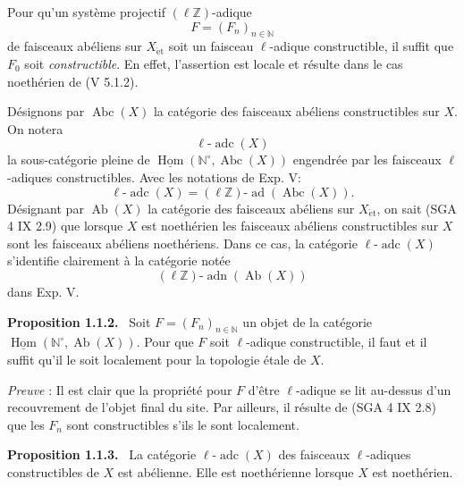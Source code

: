 \documentclass[11pt]{article}
\newenvironment{statement}[1]{\par\medskip\noindent\textbf{#1.}\ }{\par\medskip}
\DeclareMathOperator{\Hom}{Hom}
\providecommand{\uHom}{\underline{\Hom}}
\providecommand{\Hom}{\operatorname{Hom}}
\providecommand{\adn}{\operatorname{adn}}
\providecommand{\Ab}{\operatorname{Ab}}
\providecommand{\Abc}{\operatorname{Abc}}
\providecommand{\adc}{\operatorname{adc}}
\providecommand{\ad}{\operatorname{ad}}
\providecommand{\adn}{\operatorname{adn}}
\providecommand{\Ab}{\operatorname{Ab}}
\providecommand{\Hom}{\operatorname{Hom}}
\begin{document}
Pour qu'un système projectif \((\ell\mathbb Z)\)-adique
\[
F=(F_n)_{n\in\mathbb N}
\]
de faisceaux abéliens sur \(X_{\mathrm{\acute et}}\) soit un faisceau \(\ell\)-adique constructible, il suffit que \(F_0\) soit \emph{constructible}. En effet, l'assertion est locale et résulte dans le cas noethérien de (V 5.1.2).

Désignons par \(\Abc(X)\) la catégorie des faisceaux abéliens constructibles sur \(X\). On notera
\[
\ell\text{-}\adc(X)
\]
la sous-catégorie pleine de \(\uHom(\mathbb N^{\circ},\Abc(X))\) engendrée par les faisceaux
\(\ell\)-adiques constructibles. Avec les notations de Exp. V:
\[
\ell\text{-}\adc(X)=(\ell\mathbb Z)\text{-}\ad(\Abc(X)).
\]
Désignant par \(\Ab(X)\) la catégorie des faisceaux abéliens sur \(X_{\mathrm{\acute et}}\), on sait (SGA 4 IX 2.9) que lorsque \(X\) est noethérien les faisceaux abéliens constructibles sur \(X\) sont les faisceaux abéliens noethériens. Dans ce cas, la catégorie \(\ell\text{-}\adc(X)\) s'identifie clairement à la catégorie notée
\[
(\ell\mathbb Z)\text{-}\adn(\Ab(X))
\]
dans Exp. V.

\begin{statement}{Proposition 1.1.2}
Soit \(F=(F_n)_{n\in\mathbb N}\) un objet de la catégorie \(\uHom(\mathbb N^\circ,\Ab(X))\). Pour que \(F\) soit \(\ell\)-adique constructible, il faut et il suffit qu'il le soit localement pour la topologie étale de \(X\).
\end{statement}

\emph{Preuve} : Il est clair que la propriété pour \(F\) d'être \(\ell\)-adique se lit au-dessus d'un recouvrement de l'objet final du site. Par ailleurs, il résulte de (SGA 4 IX 2.8) que les \(F_n\) sont constructibles s'ils le sont localement.

\begin{statement}{Proposition 1.1.3}
La catégorie \(\ell\text{-}\adc(X)\) des faisceaux \(\ell\)-adiques constructibles de \(X\) est abélienne. Elle est noethérienne lorsque \(X\) est noethérien.
\end{statement}
\end{document}
